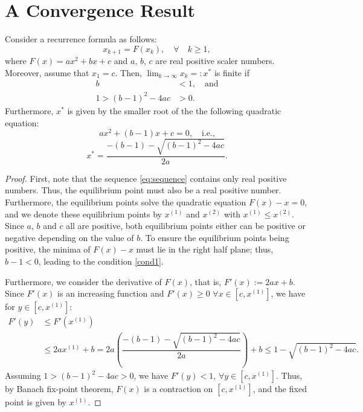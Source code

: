 \appendix
\section{A Convergence Result} 
\begin{lemma}\label{appendix_convergence}
	Consider a recurrence formula as follows:
	\begin{equation}\label{eq:sequence}
	x_{k+1} = F(x_k), \quad\forall \quad k\geq 1,
	\end{equation}
	where $F(x) = ax^2+bx+c$ and $a$, $b$, $c$ are real positive scaler numbers. Moreover, assume that $x_1 = c$.   Then, $\lim\nolimits_{k\rightarrow \infty}x_k =:x^*$ is finite if 
	\begin{subequations}
		\begin{align}
		b&<1, \quad \text{and} \label{cond1}\\
1>(b-1)^2-4ac &> 0.\label{cond2} 
\end{align}
	\end{subequations}
Furthermore,  $x^*$ is given by the smaller root of the the following quadratic equation:
$$ax^2 + (b-1)x +c = 0, \quad\text{i.e.,}$$
	\begin{equation}
	x^* = \dfrac{ -(b-1) - \sqrt{(b-1)^2-4ac}}{2a}.
	\end{equation}
	\end{lemma} 
	\begin{proof}
		First, note that the sequence \eqref{eq:sequence} contains only  real positive numbers. Thus, the equilibrium point  must also be  a real positive number. Furthermore, the equilibrium points solve the quadratic equation $F(x)-x = 0$, and we denote these equilibrium points by $x^{(1)}$ and $x^{(2)}$ with $x^{(1)}\leq x^{(2)}$.  Since $a$, $b$ and $c$ all are positive, both equilibrium points either can be positive or negative depending on the value of $b$.  To ensure the equilibrium points being positive, the minima of $F(x)-x$ must lie in the right half plane; thus, $b-1<0$, leading to the condition \eqref{cond1}. 
		
		Furthermore, we consider the derivative of $F(x)$, that is, $F'(x) := 2ax+b$.   Since $F'(x)$ is an increasing function and $F'(x) \geq 0$ $ \forall x \in [c,x^{(1)}]$, we have for $y \in [c,x^{(1)}]$:
		\begin{align*}
		 F'(y) &\leq  F'(x^{(1)})\\
		 &\leq 2ax^{(1)}+b = 2a\left(\dfrac{-(b-1) - \sqrt{(b-1)^2-4ac}}{2a} \right)  + b 
		  \leq 1 - \sqrt{(b-1)^2-4ac} .
		\end{align*}
	  Assuming  $1>(b-1)^2-4ac >0$, we have  $F'(y)  <1$, $\forall y\in [c,x^{(1)}]$.  Thus, by Banach fix-point theorem,  $F(x)$ is a contraction on $[c,x^{(1)}]$, and the fixed point is given by $x^{(1)}$.
\end{proof}
